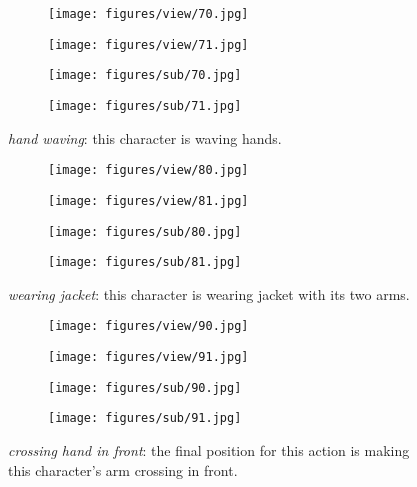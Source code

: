 \documentclass[runningheads]{llncs}
\begin{document}
\begin{figure}[h!]
  \centering
  \begin{subfigure}{0.99\textwidth}
    \texttt{[image: figures/view/70.jpg]}
\end{subfigure}
  \begin{subfigure}{0.99\textwidth}
    \texttt{[image: figures/view/71.jpg]}
\end{subfigure}
  \begin{subfigure}{0.99\textwidth}
    \texttt{[image: figures/sub/70.jpg]}
\end{subfigure}
  \begin{subfigure}{0.99\textwidth}
    \texttt{[image: figures/sub/71.jpg]}
\end{subfigure}
  \caption{\textit{hand waving}: this character is waving hands.}
  \label{fig:ntu_7}
\end{figure}



\begin{figure}[h!]
  \centering
  \begin{subfigure}{0.99\textwidth}
    \texttt{[image: figures/view/80.jpg]}
\end{subfigure}
  \begin{subfigure}{0.99\textwidth}
    \texttt{[image: figures/view/81.jpg]}
\end{subfigure}
  \begin{subfigure}{0.99\textwidth}
    \texttt{[image: figures/sub/80.jpg]}
\end{subfigure}
  \begin{subfigure}{0.99\textwidth}
    \texttt{[image: figures/sub/81.jpg]}
\end{subfigure}
  \caption{\textit{wearing jacket}: this character is wearing jacket with its two arms.}
  \label{fig:ntu_8}
\end{figure}

\begin{figure}[h!]
  \centering
  \begin{subfigure}{0.99\textwidth}
    \texttt{[image: figures/view/90.jpg]}
\end{subfigure}
  \begin{subfigure}{0.99\textwidth}
    \texttt{[image: figures/view/91.jpg]}
\end{subfigure}
  \begin{subfigure}{0.99\textwidth}
    \texttt{[image: figures/sub/90.jpg]}
\end{subfigure}
  \begin{subfigure}{0.99\textwidth}
    \texttt{[image: figures/sub/91.jpg]}
\end{subfigure}
  \caption{\textit{crossing hand in front}: the final position for this action is making this character's arm crossing in front.}
  \label{fig:ntu_9}
\end{figure}
\end{document}
